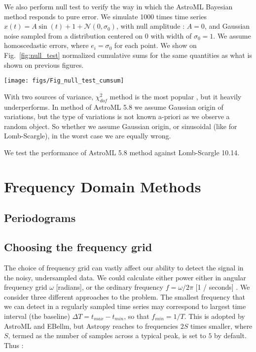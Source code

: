 \documentclass[fleqn,usenatbib]{mnras}  %
\begin{document}
We also perform null test to verify the way in which the AstroML Bayesian method responds to pure error.  We simulate 1000 times time series  $x(t) = A \sin{(t)}+1+\mathcal{N}(0,\sigma_{0})$, with  null amplitude : $A =0$, and Gaussian noise sampled from a distribution centered on 0 with width  of  $\sigma_{0} = 1$. We assume homoscedastic errors,  where $e_{i} =\sigma_{0} $ for each point. We show on Fig.~\ref{fig:null_test}  normalized cumulative sums for the same quantities as what is shown on previous figures. 


\begin{figure*}
 \texttt{[image: figs/Fig\_null\_test\_cumsum]}
  \caption{A sanity check: setting A=0, we  perform  1000 realizations of harmonic time series with Gaussian unit noise  (as Figs.~\ref{fig:chi2_and_SN},\ref{fig:completeness_curve},\ref{fig:chi_sn_scatter},\ref{fig:A_vs_chi2},\ref{fig:A_vs_SN},\ref{fig:A_vs_sigma}). From left to right,panels show cumulative sums of $\chi^{2}_{DOF}$, S/N ratio ( = $\hat \sigma$ / $st.dev.[p(\sigma)]$  per iteration), the mean $\sigma$  ($\hat \sigma$), $\sigma(L^{0})$ : $\sigma$ at the 2-D maximum of the full log-likelihood. [more info : why do these plots make sense ? ]}
\label{fig:null_test}
\end{figure*}




With two sources of variance, $\chi^{2}_{dof} $ method is the  most popular , but it heavily underperforms. In method of AstroML 5.8 we assume Gaussian origin of variations, but the type of variations is not known a-priori as we observe a random object. So whether we assume Gaussian origin, or sinusoidal (like for Lomb-Scargle), in the worst case we are equally wrong. 

We test the performance of AstroML 5.8 method against Lomb-Scargle 10.14. 

\section{Frequency Domain Methods}

\subsection{Periodograms}


\subsection{Choosing the frequency grid}
The choice of frequency grid can vastly affect our ability to detect the signal in the noisy, undersampled data. 
We could calculate either power either in angular frequency grid $\omega$ [radians], or the ordinary frequency $f = \omega / 2  \pi$ [1 / seconds] . 
We consider three different approaches to the problem.  
The smallest frequency that we can detect in a regularly sampled time series may correspond to largest time interval (the baseline) $\Delta T = t_{max} - t_{min}$, so that $f_{min} = 1 / T$. This is adopted by AstroML and EBellm, but Astropy reaches to frequencies $2 S$ times smaller, where $S$, termed as the number of samples across a typical peak, is set to $5$ by default. Thus :
\end{document}

